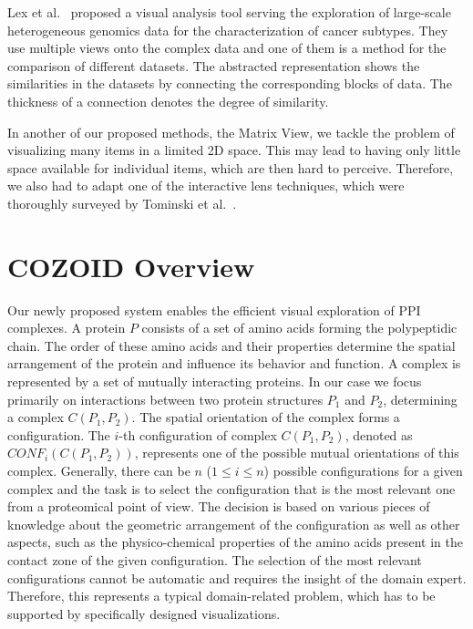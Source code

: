 \documentclass[twocolumn]{bmcart}%
\def\MatView {Matrix View\xspace}
\begin{document}
Lex et al.~\cite{Lex2012} proposed a visual analysis tool serving the exploration of large-scale heterogeneous genomics data for the characterization of cancer subtypes.
They use multiple views onto the complex data and one of them is a method for the comparison of different datasets.
The abstracted representation shows the similarities in the datasets by connecting the corresponding blocks of data. 
The thickness of a connection denotes the degree of similarity.

In another of our proposed methods, the \MatView, we tackle the problem of visualizing many items in a limited 2D space.
This may lead to having only little space available for individual items, which are then hard to perceive.
Therefore, we also had to adapt one of the interactive lens techniques, which were thoroughly surveyed by Tominski et al.~\cite{Tominski2014}.

\section{COZOID Overview}
Our newly proposed system enables the efficient visual exploration of PPI complexes.
A protein $P$ consists of a set of amino acids forming the polypeptidic chain.
The order of these amino acids and their properties determine the spatial arrangement of the protein and influence its behavior and function.
A complex is represented by a set of mutually interacting proteins.
In our case we focus primarily on interactions between two protein structures $P_1$ and $P_2$, determining a complex $C(P_1,P_2)$.
The spatial orientation of the complex forms a configuration.
The $i$-th configuration of complex $C(P_1,P_2)$, denoted as $CONF_i(C(P_1,P_2))$, represents one of the possible mutual orientations of this complex.
Generally, there can be $n$ ($1 \leq i \leq n$) possible configurations for a given complex and the task is to select the configuration that is the most relevant one from a proteomical point of view.
The decision is based on various pieces of knowledge about the geometric arrangement of the configuration as well as other aspects, such as the physico-chemical properties of the amino acids present in the contact zone of the given configuration.
The selection of the most relevant configurations cannot be automatic and requires the insight of the domain expert.
Therefore, this represents a typical domain-related problem, which has to be supported by specifically designed visualizations.
\end{document}
